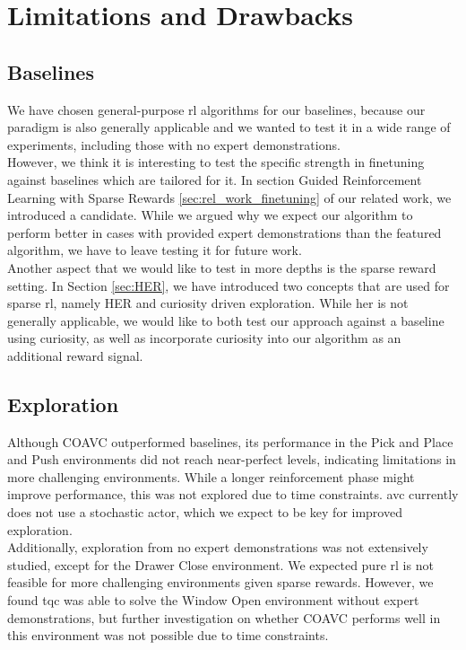 \section{Limitations and Drawbacks}
\subsection{Baselines}
We have chosen general-purpose \ac{rl} algorithms for our baselines, because our paradigm is also generally applicable 
and we wanted to test it in a wide range of experiments, including those with no expert demonstrations.\\ 

However, we think it is interesting to test the specific strength in finetuning against baselines which are 
tailored for it. In section Guided Reinforcement Learning with Sparse Rewards \ref{sec:rel_work_finetuning} of our related work, we introduced 
a candidate. While we argued why we expect our algorithm to perform better in cases with provided expert demonstrations than the featured algorithm, we have to 
leave testing it for future work.\\

Another aspect that we would like to test in more depths is the sparse reward setting. In Section \ref{sec:HER}, we have introduced two concepts that are used for sparse \ac{rl}, namely 
HER and curiosity driven exploration. While \ac{her} is not generally applicable, we would like to both test our approach against a baseline using curiosity, as well as incorporate 
curiosity into our algorithm as an additional reward signal. 

\subsection{Exploration}
Although COAVC outperformed baselines, its performance in the Pick and Place and Push environments did not reach near-perfect levels, 
indicating limitations in more challenging environments. While a longer reinforcement phase might improve performance, this was not explored 
due to time constraints. \ac{avc} currently does not use a stochastic actor, which we expect to be key for improved exploration.\\ 

Additionally, exploration from no expert demonstrations was not extensively studied, except for the Drawer Close 
environment. We expected pure \ac{rl} is not feasible for more challenging environments given sparse rewards. 
However, we found \ac{tqc} was able to solve the Window Open environment without expert demonstrations, but further investigation on whether 
COAVC performs well in this environment was not possible due to time constraints.\\ 

